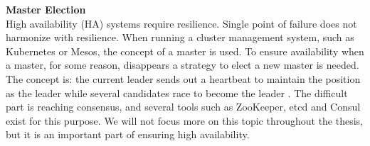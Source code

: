 \noindent \textbf{Master Election} \\
High availability (HA) systems require resilience. Single point of failure does not harmonize with resilience. When running a cluster management system, such as Kubernetes or Mesos, the concept of a master is used. To ensure availability when a master, for some reason, disappears a strategy to elect a new master is needed. The concept is: the current leader sends out a heartbeat to maintain the position as the leader while several candidates race to become the leader \cite{kubernetesio}. The difficult part is reaching consensus, and several tools such as ZooKeeper, etcd and Consul exist for this purpose. We will not focus more on this topic throughout the thesis, but it is an important part of ensuring high availability. 